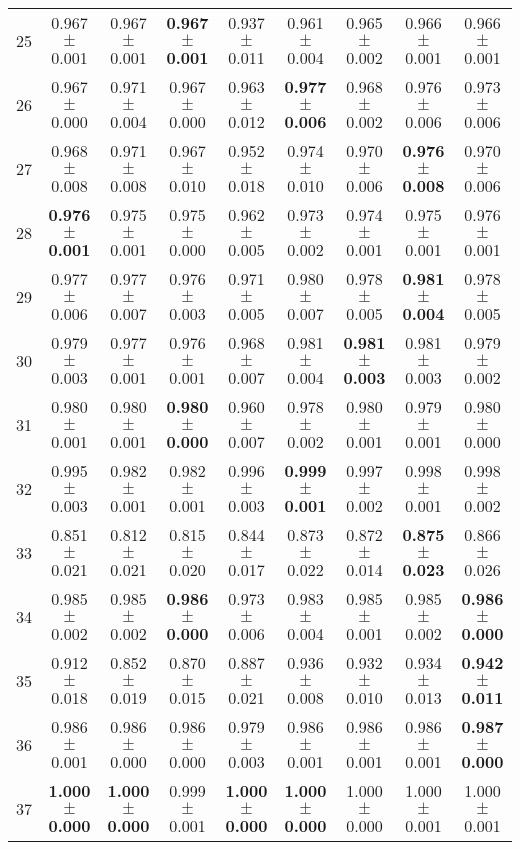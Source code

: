 \begin{table}[!ht]
{\begin{tabular}{r c c c c c c c c}
25 & 0.967 $\pm$ 0.001 & 0.967 $\pm$ 0.001 & \textbf{0.967 $\pm$ 0.001} & 0.937 $\pm$ 0.011 & 0.961 $\pm$ 0.004 & 0.965 $\pm$ 0.002 & 0.966 $\pm$ 0.001 & 0.966 $\pm$ 0.001 \\
26 & 0.967 $\pm$ 0.000 & 0.971 $\pm$ 0.004 & 0.967 $\pm$ 0.000 & 0.963 $\pm$ 0.012 & \textbf{0.977 $\pm$ 0.006} & 0.968 $\pm$ 0.002 & 0.976 $\pm$ 0.006 & 0.973 $\pm$ 0.006 \\
27 & 0.968 $\pm$ 0.008 & 0.971 $\pm$ 0.008 & 0.967 $\pm$ 0.010 & 0.952 $\pm$ 0.018 & 0.974 $\pm$ 0.010 & 0.970 $\pm$ 0.006 & \textbf{0.976 $\pm$ 0.008} & 0.970 $\pm$ 0.006 \\
28 & \textbf{0.976 $\pm$ 0.001} & 0.975 $\pm$ 0.001 & 0.975 $\pm$ 0.000 & 0.962 $\pm$ 0.005 & 0.973 $\pm$ 0.002 & 0.974 $\pm$ 0.001 & 0.975 $\pm$ 0.001 & 0.976 $\pm$ 0.001 \\
29 & 0.977 $\pm$ 0.006 & 0.977 $\pm$ 0.007 & 0.976 $\pm$ 0.003 & 0.971 $\pm$ 0.005 & 0.980 $\pm$ 0.007 & 0.978 $\pm$ 0.005 & \textbf{0.981 $\pm$ 0.004} & 0.978 $\pm$ 0.005 \\
30 & 0.979 $\pm$ 0.003 & 0.977 $\pm$ 0.001 & 0.976 $\pm$ 0.001 & 0.968 $\pm$ 0.007 & 0.981 $\pm$ 0.004 & \textbf{0.981 $\pm$ 0.003} & 0.981 $\pm$ 0.003 & 0.979 $\pm$ 0.002 \\
31 & 0.980 $\pm$ 0.001 & 0.980 $\pm$ 0.001 & \textbf{0.980 $\pm$ 0.000} & 0.960 $\pm$ 0.007 & 0.978 $\pm$ 0.002 & 0.980 $\pm$ 0.001 & 0.979 $\pm$ 0.001 & 0.980 $\pm$ 0.000 \\
32 & 0.995 $\pm$ 0.003 & 0.982 $\pm$ 0.001 & 0.982 $\pm$ 0.001 & 0.996 $\pm$ 0.003 & \textbf{0.999 $\pm$ 0.001} & 0.997 $\pm$ 0.002 & 0.998 $\pm$ 0.001 & 0.998 $\pm$ 0.002 \\
33 & 0.851 $\pm$ 0.021 & 0.812 $\pm$ 0.021 & 0.815 $\pm$ 0.020 & 0.844 $\pm$ 0.017 & 0.873 $\pm$ 0.022 & 0.872 $\pm$ 0.014 & \textbf{0.875 $\pm$ 0.023} & 0.866 $\pm$ 0.026 \\
34 & 0.985 $\pm$ 0.002 & 0.985 $\pm$ 0.002 & \textbf{0.986 $\pm$ 0.000} & 0.973 $\pm$ 0.006 & 0.983 $\pm$ 0.004 & 0.985 $\pm$ 0.001 & 0.985 $\pm$ 0.002 & \textbf{0.986 $\pm$ 0.000} \\
35 & 0.912 $\pm$ 0.018 & 0.852 $\pm$ 0.019 & 0.870 $\pm$ 0.015 & 0.887 $\pm$ 0.021 & 0.936 $\pm$ 0.008 & 0.932 $\pm$ 0.010 & 0.934 $\pm$ 0.013 & \textbf{0.942 $\pm$ 0.011} \\
36 & 0.986 $\pm$ 0.001 & 0.986 $\pm$ 0.000 & 0.986 $\pm$ 0.000 & 0.979 $\pm$ 0.003 & 0.986 $\pm$ 0.001 & 0.986 $\pm$ 0.001 & 0.986 $\pm$ 0.001 & \textbf{0.987 $\pm$ 0.000} \\
37 & \textbf{1.000 $\pm$ 0.000} & \textbf{1.000 $\pm$ 0.000} & 0.999 $\pm$ 0.001 & \textbf{1.000 $\pm$ 0.000} & \textbf{1.000 $\pm$ 0.000} & 1.000 $\pm$ 0.000 & 1.000 $\pm$ 0.001 & 1.000 $\pm$ 0.001 \\

\end{tabular}}
\end{table}
